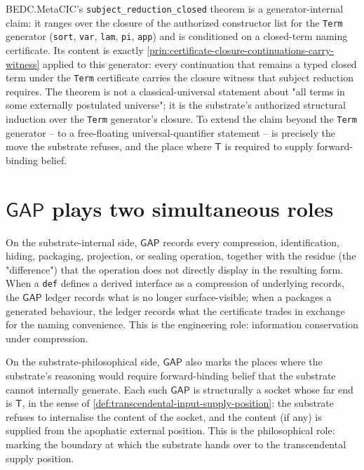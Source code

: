 \begin{example}
\label{ex:certificate-closure-subject-reduction-generator-internal}
BEDC.MetaCIC's \texttt{subject\_reduction\_closed} theorem is a generator-internal claim: it ranges over the closure of the authorized constructor list for the \texttt{Term} generator (\texttt{sort}, \texttt{var}, \texttt{lam}, \texttt{pi}, \texttt{app}) and is conditioned on a closed-term naming certificate. Its content is exactly \autoref{prin:certificate-closure-continuations-carry-witness} applied to this generator: every continuation that remains a typed closed term under the \texttt{Term} certificate carries the closure witness that subject reduction requires. The theorem is not a classical-universal statement about "all terms in some externally postulated universe"; it is the substrate's authorized structural induction over the \texttt{Term} generator's closure. To extend the claim beyond the \texttt{Term} generator -- to a free-floating universal-quantifier statement -- is precisely the move the substrate refuses, and the place where $\mathsf{T}$ is required to supply forward-binding belief.
\end{example}

\section{$\mathsf{GAP}$ plays two simultaneous roles}
\label{sec:certificate-closure-gap-two-roles}

\begin{principle}
\label{prin:certificate-closure-gap-as-information-ledger}
On the substrate-internal side, $\mathsf{GAP}$ records every compression, identification, hiding, packaging, projection, or sealing operation, together with the residue (the "difference") that the operation does not directly display in the resulting form. When a \texttt{def} defines a derived interface as a compression of underlying records, the $\mathsf{GAP}$ ledger records what is no longer surface-visible; when a \NameCert{} packages a generated behaviour, the ledger records what the certificate trades in exchange for the naming convenience. This is the engineering role: information conservation under compression.
\end{principle}

\begin{principle}
\label{prin:certificate-closure-gap-as-T-socket}
On the substrate-philosophical side, $\mathsf{GAP}$ also marks the places where the substrate's reasoning would require forward-binding belief that the substrate cannot internally generate. Each such $\mathsf{GAP}$ is structurally a socket whose far end is $\mathsf{T}$, in the sense of \autoref{def:transcendental-input-supply-position}: the substrate refuses to internalise the content of the socket, and the content (if any) is supplied from the apophatic external position. This is the philosophical role: marking the boundary at which the substrate hands over to the transcendental supply position.
\end{principle}

